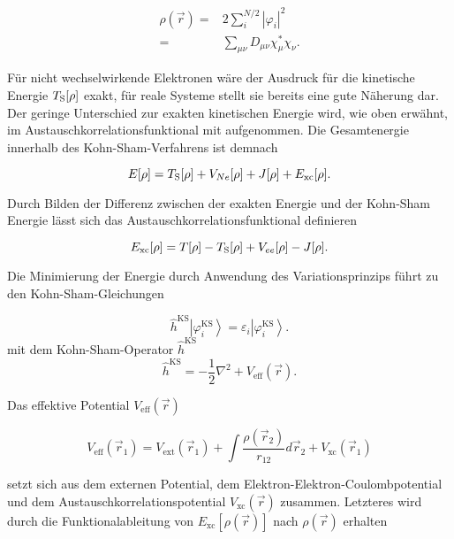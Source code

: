 \begin{equation}
\begin{aligned}
\rho(\vec{r}) =& 2\sum_i^{N/2}|\varphi_i|^2\\
=&\sum_{\mu\nu}D_{\mu\nu}\chi_{\mu}^*\chi_\nu .
\end{aligned}
\end{equation}

Für nicht wechselwirkende Elektronen wäre der Ausdruck für die kinetische Energie $T_{\textrm S}[\rho]$ exakt, für reale Systeme stellt sie bereits eine gute Näherung dar. Der geringe Unterschied zur exakten kinetischen Energie wird, wie oben erwähnt, im Austauschkorrelationsfunktional mit aufgenommen. Die Gesamtenergie innerhalb des Kohn-Sham-Verfahrens ist demnach

\begin{equation}
E[\rho] = T_{\textrm S}[\rho] + V_{Ne}[\rho]+J[\rho]+E_{\textrm{xc}}[\rho].
\end{equation}

Durch Bilden der Differenz zwischen der exakten Energie und der Kohn-Sham Energie lässt sich das Austauschkorrelationsfunktional definieren

\begin{equation}
E_{\textrm{xc}}[\rho] = T[\rho]-T_{\textrm S}[\rho]+V_{ee}[\rho]-J[\rho].
\end{equation}

Die Minimierung der Energie durch Anwendung des Variationsprinzips führt zu den Kohn-Sham-Gleichungen

\begin{equation}
\hat{h}^{\textrm{KS}}\left|\varphi_i^{\textrm{KS}}\right\rangle=\varepsilon_i\left|\varphi_i^{\textrm{KS}}\right\rangle.
\end{equation}
mit dem Kohn-Sham-Operator $\hat{h}^{\textrm{KS}}$
\begin{equation}
\hat{h}^{\textrm{KS}} = -\frac{1}{2}\nabla^2+V_{\textrm{eff}}(\vec{r}).
\end{equation}

Das effektive Potential $V_{\textrm{eff}}(\vec{r})$

\begin{equation}
V_{\textrm{eff}}(\vec{r}_1) = V_{\textrm{ext}}(\vec{r}_1)+\int\frac{\rho(\vec{r}_2)}{r_{12}}d\vec{r}_2 + V_{\textrm{xc}}(\vec{r}_1)
\end{equation}

setzt sich aus dem externen Potential, dem Elektron-Elektron-Coulombpotential und dem Austauschkorrelationspotential $V_{\textrm{xc}}(\vec{r})$ zusammen. Letzteres wird durch die Funktionalableitung von $E_{\textrm{xc}}[\rho(\vec{r})]$ nach $\rho(\vec{r})$ erhalten

